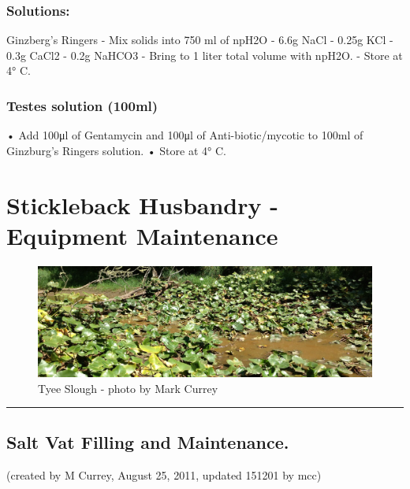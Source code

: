 \documentclass[
]{book}
\begin{document}
\hypertarget{solutions-2}{%
\subsection{Solutions:}\label{solutions-2}}

Ginzberg's Ringers
- Mix solids into 750 ml of npH2O
- 6.6g NaCl
- 0.25g KCl
- 0.3g CaCl2
- 0.2g NaHCO3
- Bring to 1 liter total volume with npH2O.
- Store at 4° C.

\hypertarget{testes-solution-100ml}{%
\subsection{Testes solution (100ml)}\label{testes-solution-100ml}}

• Add 100μl of Gentamycin and 100μl of Anti-biotic/mycotic to 100ml of Ginzburg's Ringers solution.
• Store at 4° C.

\hypertarget{stickleback-husbandry---equipment-maintenance}{%
\chapter{Stickleback Husbandry - Equipment Maintenance}\label{stickleback-husbandry---equipment-maintenance}}

\begin{figure}
\centering
\includegraphics{images/tyee_slough_header.jpg}
\caption{Tyee Slough - photo by Mark Currey}
\end{figure}

\begin{center}\rule{0.5\linewidth}{0.5pt}\end{center}

\hypertarget{salt-vat-filling-and-maintenance.}{%
\section{Salt Vat Filling and Maintenance.}\label{salt-vat-filling-and-maintenance.}}

(created by M Currey, August 25, 2011, updated 151201 by mcc)
\end{document}
